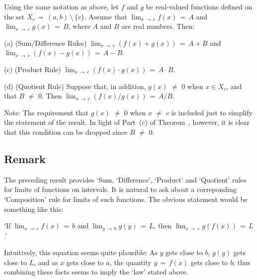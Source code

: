         Using the same notation as above, let $f$ and $g$ be real-valued functions defined on the set $X_{c} \,=\, (a,b)\,{\setminus}\,\{c\}$.
    Assume that ${\displaystyle \lim_{x \,{\rightarrow}\, c} f(x) \,=\, A}$ and ${\displaystyle \lim_{x \,{\rightarrow}\, c} g(x) \,=\, B}$,
    where $A$ and $B$ are real numbers. Then:

\V
        (a) (Sum/Difference Rules)
    ${\displaystyle \lim_{x \,{\rightarrow}\, c} (f(x)+g(x)) \,=\, A+B}$ and ${\displaystyle \lim_{x \,{\rightarrow}\, c} (f(x)-g(x)) \,=\, A-B}$.

\V

        (c) (Product Rule)
    ${\displaystyle \lim_{x \,{\rightarrow}\, c} (f(x){\cdot}g(x)) \,=\, A{\cdot}B}$.

\V

        (d) (Quotient Rule)
    Suppose that, in addition, $g(x) \,\,{\neq}\,\, 0$ when $x{\in}X_{c}$, and that $B \,\,{\neq}\,\, 0$.
    Then ${\displaystyle \lim_{x \,{\rightarrow}\, c} (f(x)/g(x)) \,=\, A/B}$.

    Note: The requirement that $g(x) \,\,{\neq}\,\, 0$ when $x \,\,{\neq}\,\, c$ is included just to simplify the statement of the result.
    In light of Part~(c) of Theorem~, however, it is clear that this condition can be dropped since $B \,\,{\neq}\,\, 0$.

\VV


            \subsection{\small{\bf Remark}}
            \label{RemrkC90.80}

        The preceding result provides `Sum, `Difference', `Product' and `Quotient' rules for limits of functions on intervals.
    It is natural to ask about a correponding `Composition' rule for limits of such functions.
    The obvious statement would be something like this:

        `If ${\displaystyle \lim_{x \,{\rightarrow}\, c}} f(x) \,=\, b$ and ${\displaystyle \lim_{y \,{\rightarrow}\, b} g(y) \,=\, L}$, then
    ${\displaystyle \lim_{x \,{\rightarrow}\, c} g(f(x)) \,=\, L}$.'

\noindent Intuitively, this equation seems quite plausible:  As $y$ gets close to $b$, $g(y)$ gets close to $L$,
    and as $x$ gets close to $a$, the quantity $y \,=\, f(x)$ gets close to $b$;
    thus combining these facts seems to imply the `law' stated above.

